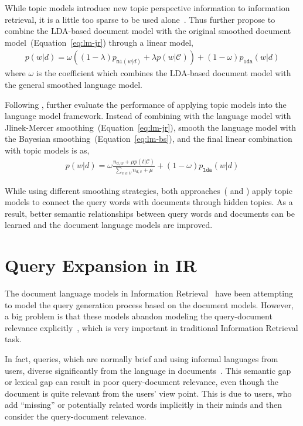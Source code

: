 While topic models introduce new topic perspective information to information retrieval, it is a little too sparse to be used alone~\citep{wei-06}. Thus \cite{wei-06} further propose to combine the LDA-based document model with the original smoothed document model~(Equation~\ref{eq:lm-jr}) through a linear model,
\begin{align}
p(w|d) = \omega ((1 - \lambda) p_{\texttt{ml}(w|d)} + \lambda p(w|\mathcal{C})) + (1 - \omega) p_{\texttt{lda}}(w|d)
\end{align}
where $\omega$ is the coefficient which combines the LDA-based document model with the general smoothed language model.

Following \cite{wei-06}, \cite{Lu-2011} further evaluate the performance of applying topic models into the language model framework. Instead of combining with the language model with Jlinek-Mercer smoothing~(Equation~\ref{eq:lm-jr}), \cite{Lu-2011} smooth the language model with the Bayesian smoothing~(Equation~\ref{eq:lm-bs}), and the final linear combination with topic models is as,
\begin{align}
p(w|d) = \omega \frac{n_{d,w} + \mu p(t|\mathcal{C})}{\sum_{v \in V} n_{d,v} + \mu}  + (1 - \omega) p_{\texttt{lda}}(w|d)
\end{align}

While using different smoothing strategies, both approaches~(\citep{wei-06} and \citep{Lu-2011}) apply topic models to connect the query words with documents through hidden topics. As a result, better semantic relationships between query words and documents can be learned and the document language models are improved.

\section{Query Expansion in IR}

The document language models in Information Retrieval~\citep{PonteCroft} have been attempting to model the query generation process based on the document models. However, a big problem is that these models abandon modeling the query-document relevance explicitly~\citep{Lavrenko-2001}, which is very important in traditional Information Retrieval task.

In fact, queries, which are normally brief and using informal languages from users, diverse significantly from the language in documents~\citep{Muller-2009}. This semantic gap or lexical gap can result in poor query-document relevance, even though the document is quite relevant from the users' view point. This is due to users, who add ``missing'' or potentially related words implicitly in their minds and then consider the query-document relevance. 

